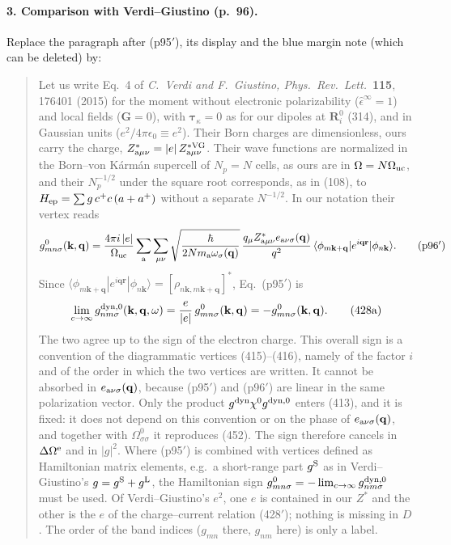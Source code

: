 \paragraph{3. Comparison with Verdi--Giustino (p.~96).}
Replace the paragraph after (p95$'$), its display and the blue margin note (which can be deleted) by:
\begin{quote}
Let us write Eq.~4 of \textit{C.~Verdi and F.~Giustino, Phys.\ Rev.\ Lett.}\ \textbf{115}, 176401 (2015)
for the moment without electronic polarizability ($\hat\epsilon^\infty=1$) and local fields ($\mathbf G=0$),
with $\boldsymbol\tau_\kappa=0$ as for our dipoles at $\mathbf R^0_i$ (314), and in Gaussian units
($e^2/4\pi\epsilon_0\equiv e^2$). Their Born charges are dimensionless, ours carry the charge,
$Z^*_{{\rm a}\mu\nu}=|e|\,Z^{*\rm VG}_{{\rm a}\mu\nu}$. Their wave functions are normalized in the
Born--von K\'arm\'an supercell of $N_p=N$ cells, as ours are in $\Omega=N\Omega_{\rm uc}$, and their
$N_p^{-1/2}$ under the square root corresponds, as in (108), to $H_{\rm ep}=\sum g\,c^+c\,(a+a^+)$
without a separate $N^{-1/2}$. In our notation their vertex reads
\begin{equation*}
g^0_{mn\sigma}(\mathbf k,\mathbf q)=\frac{4\pi i\,|e|}{\Omega_{\rm uc}}\sum_{\rm a}\sum_{\mu\nu}
\sqrt{\frac{\hbar}{2Nm_{\rm a}\omega_\sigma(\mathbf q)}}\,
\frac{q_\mu Z^*_{{\rm a}\mu\nu}e_{{\rm a}\nu\sigma}(\mathbf q)}{q^2}\,
\langle\phi_{m\mathbf k+\mathbf q}|e^{i\mathbf q\mathbf r}|\phi_{n\mathbf k}\rangle .
\tag{p96$'$}
\end{equation*}
Since $\langle\phi_{m\mathbf k+\mathbf q}|e^{i\mathbf q\mathbf r}|\phi_{n\mathbf k}\rangle=[\rho_{n\mathbf k,m\mathbf k+\mathbf q}]^*$,
Eq.~(p95$'$) is
\begin{equation*}
\lim_{c\to\infty}g^{\rm dyn,0}_{nm\sigma}(\mathbf k,\mathbf q,\omega)=\frac{e}{|e|}\,g^0_{mn\sigma}(\mathbf k,\mathbf q)
=-g^0_{mn\sigma}(\mathbf k,\mathbf q).
\tag{428a}
\end{equation*}
The two agree up to the sign of the electron charge. This overall sign is a convention of the
diagrammatic vertices (415)--(416), namely of the factor $i$ and of the order in which the two vertices
are written. It cannot be absorbed in $e_{{\rm a}\nu\sigma}(\mathbf q)$, because (p95$'$) and (p96$'$) are
linear in the same polarization vector. Only the product
$g^{\rm dyn}\chi^0g^{\rm dyn,0}$ enters (413), and it is fixed: it does not depend on this convention or on the
phase of $e_{{\rm a}\nu\sigma}(\mathbf q)$, and together with $\Omega^0_{\sigma\sigma}$ it reproduces (452).
The sign therefore cancels in $\Delta\Omega^{\rm e}$ and in $|g|^2$. Where (p95$'$) is combined with
vertices defined as Hamiltonian matrix elements, e.g.\ a short-range part $g^{\rm S}$ as in
Verdi--Giustino's $g=g^{\rm S}+g^{\rm L}$, the Hamiltonian sign
$g^0_{mn\sigma}=-\lim_{c\to\infty}g^{\rm dyn,0}_{nm\sigma}$ must be used. Of Verdi--Giustino's $e^2$, one $e$
is contained in our $Z^*$ and the other is the $e$ of the charge--current relation (428$'$); nothing is
missing in $D$. The order of the band indices ($g_{mn}$ there, $g_{nm}$ here) is only a label.
\end{quote}

